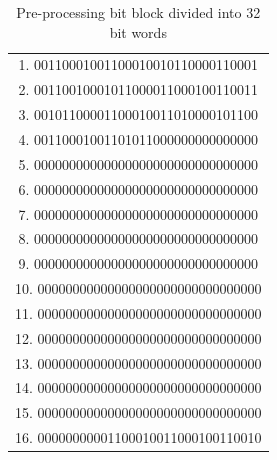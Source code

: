         \begin{table}[h]
            \caption{Pre-processing bit block divided into 32 bit words}
            \centering
            \label{table:Pre-processing bit block divided into 32 bit words}
            
            \begin{tabular}{|c|}
            \hline  

            
              1. 00110001001100010010110000110001 \\
             
              2. 00110010001011000011000100110011 \\
             
              3. 00101100001100010011010000101100 \\
             
              4. 00110001001101011000000000000000 \\
             
              5. 00000000000000000000000000000000 \\
             
              6. 00000000000000000000000000000000 \\
             
              7. 00000000000000000000000000000000 \\
             
              8. 00000000000000000000000000000000 \\
             
              9. 00000000000000000000000000000000 \\
             
              10. 00000000000000000000000000000000 \\
             
              11. 00000000000000000000000000000000 \\
             
              12. 00000000000000000000000000000000 \\
             
              13. 00000000000000000000000000000000 \\
             
              14. 00000000000000000000000000000000 \\
             
              15. 00000000000000000000000000000000 \\
             
              16. 00000000001100010011000100110010 \\
             
            \hline
            \end{tabular}
        \end{table}
        
